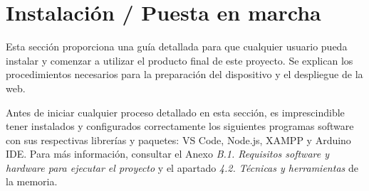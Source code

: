\section{Instalación / Puesta en marcha}
Esta sección proporciona una guía detallada para que cualquier usuario pueda instalar y comenzar a utilizar el producto final de este proyecto. Se explican los procedimientos necesarios para la preparación del dispositivo y el despliegue de la web.

Antes de iniciar cualquier proceso detallado en esta sección, es imprescindible tener instalados y configurados correctamente los siguientes programas software con sus respectivas librerías y paquetes: VS Code, Node.js, XAMPP y Arduino IDE. Para más información, consultar el Anexo \textit{B.1. Requisitos software y hardware para ejecutar el proyecto} y el apartado \textit{4.2. Técnicas y herramientas} de la memoria.

